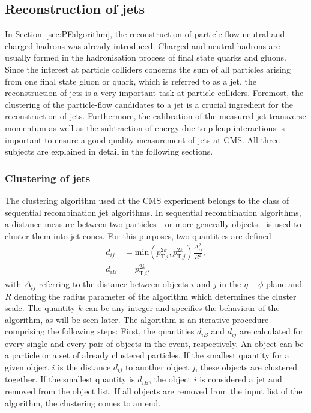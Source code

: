 \subsection{Reconstruction of jets} 
\label{sec:JetReconstruction}
In Section~\ref{sec:PFalgorithm}, the reconstruction of particle-flow neutral and charged hadrons was already introduced.
Charged and neutral hadrons are usually formed in the hadronisation process of final state quarks and gluons.
Since the interest at particle colliders concerns the sum of all particles arising from one final state gluon or quark, which is referred to as a jet, the reconstruction of jets is a very important task at particle colliders.
Foremost, the clustering of the particle-flow candidates to a jet is a crucial ingredient for the reconstruction of jets.
Furthermore, the calibration of the measured jet transverse momentum as well as the subtraction of energy due to pileup interactions is important to ensure a good quality \pt measurement of jets at CMS.
All three subjects are explained in detail in the following sections.
\subsubsection*{Clustering of jets}
The clustering algorithm used at the CMS experiment belongs to the class of sequential recombination jet algorithms.
In sequential recombination algorithms, a distance measure between two particles - or more generally objects - is used to cluster them into jet cones.
For this purposes, two quantities are defined
\begin{equation}
\begin{aligned}
\label{eq:Antikt}
d_{ij} &= \text{min}\left( p_{\text{T,}i}^{2k},p_{\text{T,}j}^{2k} \right) \frac{\Delta_{ij}^2}{R^2},\\
d_{iB} &= p_{\text{T,}i}^{2k},
\end{aligned} 
\end{equation}
with $\Delta_{ij}$ referring to the distance between objects $i$ and $j$ in the $\eta - \phi$ plane and $R$ denoting the radius parameter of the algorithm which determines the cluster scale.
The quantity $k$ can be any integer and specifies the behaviour of the algorithm, as will be seen later.
The algorithm is an iterative procedure comprising the following steps: 
First, the quantities $d_{iB}$ and $d_{ij}$ are calculated for every single and every pair of objects in the event, respectively.
An object can be a particle or a set of already clustered particles.
If the smallest quantity for a given object $i$ is the distance $d_{ij}$ to another object $j$, these objects are clustered together.
If the smallest quantity is $d_{iB}$, the object $i$ is considered a jet and removed from the object list.
If all objects are removed from the input list of the algorithm, the clustering comes to an end.

